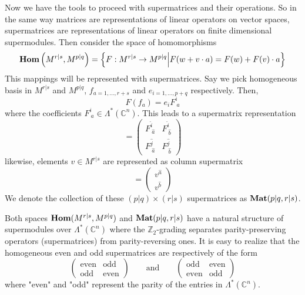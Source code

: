 \documentclass[a4paper,12pt]{article}
\numberwithin{equation}{section}
\numberwithin{thm}{section}
\numberwithin{exm}{section}
\newcommand{\Z}{{\mathbb Z}}
\newcommand{\C}{{\mathbb C}}
\newcommand{\<}{{\langle}}
\renewcommand{\>}{{\rangle}}
\renewcommand{\L}{{\Lambda}}
\begin{document}
Now we have the tools to proceed with supermatrices and their operations. So in the same way matrices are representations of linear operators on vector spaces, supermatrices are representations of linear operators on finite dimensional supermodules. Then consider the space of homomorphisms
	\begin{equation}
	{\bf Hom}\left(M^{r|s},M^{p|q}\right)=\left\{F:M^{r|s}\rightarrow M^{p|q}\middle| F(w + v\cdot a) = F(w) + F(v)\cdot a\right\}
	\end{equation}
This mappings will be represented with supermatrices. Say we pick homogeneous basis in $M^{r|s}$ and $M^{p|q}$, $f_{a=1,\ldots,r+s}$ and $e_{i=1,\ldots,p+q}$ respectively. Then,
	\begin{equation}
	F(f_a) = e_i F^i_{\ a}
	\end{equation}
where the coefficients $F^i_{\ a}\in\L^*(\C^n)$. This leads to a supermatrix representation
	\begin{equation}
	[F^i_{\ a}] = \left(
		\begin{array}{cc}
		F^{\hat i}_{\ \hat a}  & F^{\hat i}_{\ \hat b} \\
		F^{\hat j}_{\ \hat a}  & F^{\hat j}_{\ \hat b}
		\end{array}
	\right)
	\end{equation}
likewise, elements $v\in M^{r|s}$ are represented as column supermatrix
	\begin{equation}
	[v^a] = \left(
		\begin{array}{c}
		v^{\hat a} \\
		v^{\hat b}
		\end{array}
	\right)
	\end{equation}
We denote the collection of these $(p|q)\times(r|s)$ supermatrices as ${\bf Mat}(p|q,r|s)$.

Both spaces ${\bf Hom}(M^{r|s}, M^{p|q})$ and ${\bf Mat}(p|q,r|s)$ have a natural structure of supermodules over $\L^*(\C^n)$ where the $\Z_2$-grading separates parity-preserving operators (supermatrices) from parity-reversing ones. It is easy to realize that the homogeneous even and odd supermatrices are respectively of the form
	\begin{equation}
	\left(
		\begin{array}{cc}
		\text{even} & \text{odd} \\
		\text{odd} & \text{even}
		\end{array}
	\right)\qquad\text{and}\qquad \left(
		\begin{array}{cc}
		\text{odd} & \text{even} \\
		\text{even} & \text{odd}
		\end{array}
	\right)
	\end{equation}	 
where "even" and "odd" represent the parity of the entries in $\L^*(\C^n)$.
\end{document}
